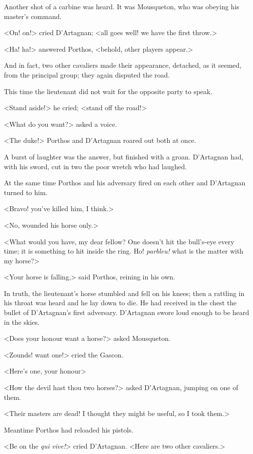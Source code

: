 Another shot of a carbine was heard. It was Mousqueton, who was obeying his master's command.

<On! on!> cried D'Artagnan; <all goes well! we have the first throw.>

<Ha! ha!> answered Porthos, <behold, other players appear.>

And in fact, two other cavaliers made their appearance, detached, as it seemed, from the principal group; they again disputed the road.

This time the lieutenant did not wait for the opposite party to speak.

<Stand aside!> he cried; <stand off the road!>

<What do you want?> asked a voice.

<The duke!> Porthos and D'Artagnan roared out both at once.

A burst of laughter was the answer, but finished with a groan. D'Artagnan had, with his sword, cut in two the poor wretch who had laughed.

At the same time Porthos and his adversary fired on each other and D'Artagnan turned to him.

<Bravo! you've killed him, I think.>

<No, wounded his horse only.>

<What would you have, my dear fellow? One doesn't hit the bull's-eye every time; it is something to hit inside the ring. Ho! \textit{parbleu!} what is the matter with my horse?>

<Your horse is falling,> said Porthos, reining in his own.

In truth, the lieutenant's horse stumbled and fell on his knees; then a rattling in his throat was heard and he lay down to die. He had received in the chest the bullet of D'Artagnan's first adversary. D'Artagnan swore loud enough to be heard in the skies.

<Does your honour want a horse?> asked Mousqueton.

<Zounds! want one!> cried the Gascon.

<Here's one, your honour\longdash>

<How the devil hast thou two horses?> asked D'Artagnan, jumping on one of them.

<Their masters are dead! I thought they might be useful, so I took them.>

Meantime Porthos had reloaded his pistols.

<Be on the \textit{qui vive!}> cried D'Artagnan. <Here are two other cavaliers.>

